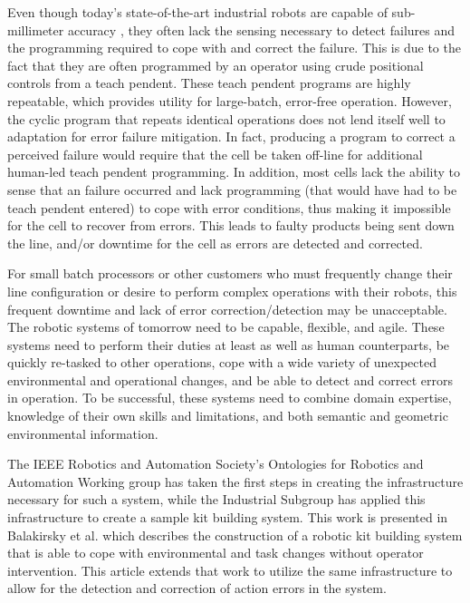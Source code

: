 \documentclass{llncs}
\begin{document}
Even though today's state-of-the-art industrial robots are capable of sub-millimeter accuracy \cite{RobotAccuracy}, they often lack the sensing
necessary to detect failures and the programming required to cope with and correct the failure. This is due to the fact that they are often programmed
by an operator using crude positional controls from a teach pendent. These teach pendent programs are highly repeatable, which provides 
utility for large-batch, error-free operation. However, the cyclic program that repeats identical operations does not lend itself well to adaptation for 
error failure mitigation. In fact, producing a program to correct a perceived failure would require that the cell be taken off-line
for additional human-led teach pendent programming. In addition, 
most cells lack the ability to sense that an failure occurred and  lack programming (that would have had to be teach pendent entered) to cope
with error conditions, thus making it impossible for the cell to recover from errors.
This leads to faulty products being sent down the line, and/or downtime for the cell as errors are detected and corrected.

For small batch processors or other customers who must frequently change their line configuration or desire to perform complex operations
with their robots, this frequent downtime and lack of error correction/detection may be unacceptable. The robotic systems of tomorrow need to be capable, flexible, and agile.  
These systems need to perform their duties at least  as well as human counterparts, be quickly re-tasked to other operations, cope with a wide 
variety of unexpected environmental and operational changes, and be able to detect and correct errors in operation. 
To be successful, these systems need to combine domain expertise, knowledge of their own skills and limitations, and both semantic and geometric 
environmental information.

The IEEE Robotics and Automation Society's Ontologies for Robotics and Automation Working group has taken the first steps in creating the 
infrastructure necessary for such a system, while the Industrial Subgroup has applied this infrastructure to create a sample kit building
system.  This work is presented in Balakirsky et al. \cite{balakirsky2013} which describes the construction of a robotic kit building
system that is able to cope with environmental and task changes without operator intervention. This article extends that work to utilize
the same infrastructure to allow for the detection and correction of action errors in the system.
\end{document}
